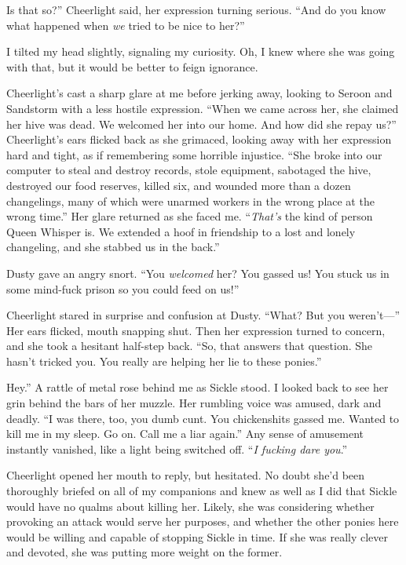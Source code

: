 \leavevmode{}Is that so?” Cheerlight said, her expression turning serious. “And do you know what happened when \textit{we} tried to be nice to her?”

I tilted my head slightly, signaling my curiosity. Oh, I knew where she was going with that, but it would be better to feign ignorance.

Cheerlight’s cast a sharp glare at me before jerking away, looking to Seroon and Sandstorm with a less hostile expression. “When we came across her, she claimed her hive was dead. We welcomed her into our home. And how did she repay us?” Cheerlight’s ears flicked back as she grimaced, looking away with her expression hard and tight, as if remembering some horrible injustice. “She broke into our computer to steal and destroy records, stole equipment, sabotaged the hive, destroyed our food reserves, killed six, and wounded more than a dozen changelings, many of which were unarmed workers in the wrong place at the wrong time.” Her glare returned as she faced me. “\textit{That’s} the kind of person Queen Whisper is. We extended a hoof in friendship to a lost and lonely changeling, and she stabbed us in the back.”

Dusty gave an angry snort. “You \textit{welcomed} her? You gassed us! You stuck us in some mind-fuck prison so you could feed on us!”

Cheerlight stared in surprise and confusion at Dusty. “What? But you weren’t—” Her ears flicked, mouth snapping shut. Then her expression turned to concern, and she took a hesitant half-step back. “So, that answers that question. She hasn’t tricked you. You really are helping her lie to these ponies.”

\leavevmode{}Hey.” A rattle of metal rose behind me as Sickle stood. I looked back to see her grin behind the bars of her muzzle. Her rumbling voice was amused, dark and deadly. “I was there, too, you dumb cunt. You chickenshits gassed me. Wanted to kill me in my sleep. Go on. Call me a liar again.” Any sense of amusement instantly vanished, like a light being switched off. “\textit{I fucking dare you}.”

Cheerlight opened her mouth to reply, but hesitated. No doubt she’d been thoroughly briefed on all of my companions and knew as well as I did that Sickle would have no qualms about killing her. Likely, she was considering whether provoking an attack would serve her purposes, and whether the other ponies here would be willing and capable of stopping Sickle in time. If she was really clever and devoted, she was putting more weight on the former.

